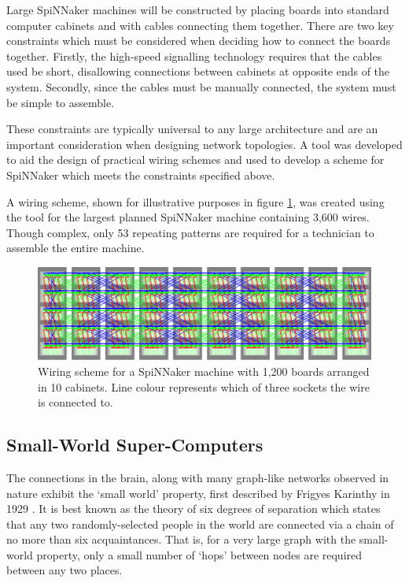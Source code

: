 		Large SpiNNaker machines will be constructed by placing boards into standard
		computer cabinets and with cables connecting them together. There are two
		key constraints which must be considered when deciding how to connect the
		boards together. Firstly, the high-speed signalling technology requires that
		the cables used be short, disallowing connections between cabinets at
		opposite ends of the system. Secondly, since the cables must be manually
		connected, the system must be simple to assemble.
		
		These constraints are typically universal to any large architecture and are
		an important consideration when designing network topologies. A tool was
		developed to aid the design of practical wiring schemes and used to develop
		a scheme for SpiNNaker which meets the constraints specified above.
		
		A wiring scheme, shown for illustrative purposes in figure
		\ref{fig:spinnaker106}, was created using the tool for the largest planned
		SpiNNaker machine containing 3,600 wires. Though complex, only 53 repeating
		patterns are required for a technician to assemble the entire machine.
		
		\begin{figure}
			\center
			\includegraphics[width=\textwidth]{figures/spinnaker106}
			\caption{Wiring scheme for a SpiNNaker machine with 1,200 boards arranged
			in 10 cabinets. Line colour represents which of three sockets the wire is
			connected to.}
			\label{fig:spinnaker106}
		\end{figure}
	
	\subsection{Small-World Super-Computers}
	
		The connections in the brain, along with many graph-like networks observed
		in nature exhibit the `small world' property, first described by Frigyes
		Karinthy in 1929 \cite{karinthy29}. It is best known as the theory of six
		degrees of separation which states that any two randomly-selected people in
		the world are connected via a chain of no more than six acquaintances. That
		is, for a very large graph with the small-world property, only a small
		number of `hops' between nodes are required between any two places.
		
